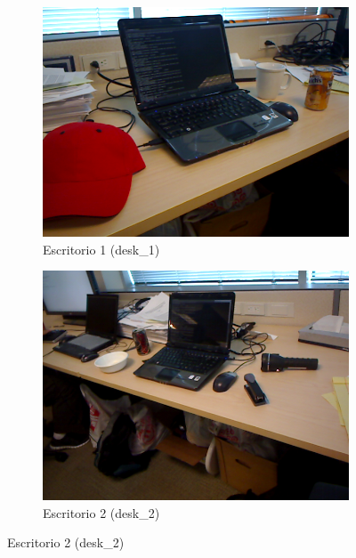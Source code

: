 \begin{figure}
    \centering
    \begin{subfigure}[b]{0.4\textwidth}
        \includegraphics[width=\textwidth]{img/base_rgbd/desk_1.png}
        \caption{Escritorio 1 (desk\_1)}
		\label{fig:desk_1}
    \end{subfigure}
    \quad
    \begin{subfigure}[b]{0.4\textwidth}
        \includegraphics[width=\textwidth]{img/base_rgbd/desk_2.png}
        \caption{Escritorio 2 (desk\_2)}
		\label{fig:desk_2}
    \end{subfigure}


\end{figure}

